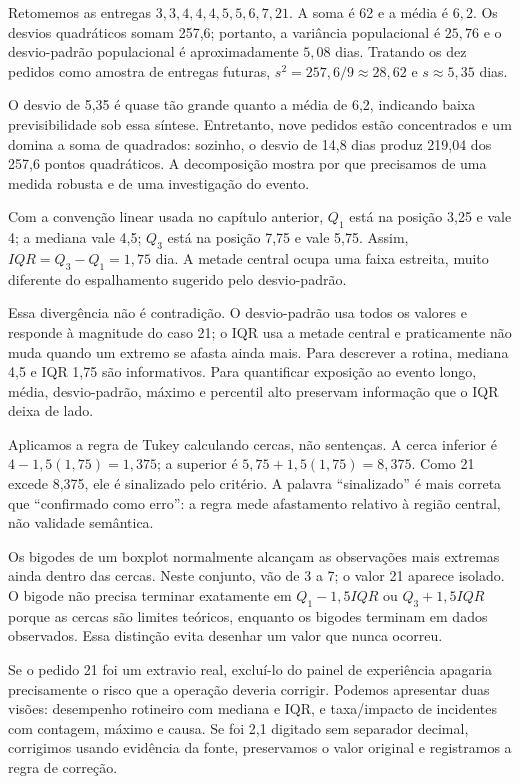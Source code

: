 Retomemos as entregas $3,3,4,4,4,5,5,6,7,21$. A soma é 62 e a média é $6{,}2$. Os desvios quadráticos somam 257,6; portanto, a variância populacional é $25{,}76$ e o desvio-padrão populacional é aproximadamente $5{,}08$ dias. Tratando os dez pedidos como amostra de entregas futuras, $s^2=257{,}6/9\approx28{,}62$ e $s\approx5{,}35$ dias.

O desvio de 5,35 é quase tão grande quanto a média de 6,2, indicando baixa previsibilidade sob essa síntese. Entretanto, nove pedidos estão concentrados e um domina a soma de quadrados: sozinho, o desvio de 14,8 dias produz 219,04 dos 257,6 pontos quadráticos. A decomposição mostra por que precisamos de uma medida robusta e de uma investigação do evento.

Com a convenção linear usada no capítulo anterior, $Q_1$ está na posição 3,25 e vale 4; a mediana vale 4,5; $Q_3$ está na posição 7,75 e vale 5,75. Assim, $IQR=Q_3-Q_1=1{,}75$ dia. A metade central ocupa uma faixa estreita, muito diferente do espalhamento sugerido pelo desvio-padrão.

Essa divergência não é contradição. O desvio-padrão usa todos os valores e responde à magnitude do caso 21; o IQR usa a metade central e praticamente não muda quando um extremo se afasta ainda mais. Para descrever a rotina, mediana 4,5 e IQR 1,75 são informativos. Para quantificar exposição ao evento longo, média, desvio-padrão, máximo e percentil alto preservam informação que o IQR deixa de lado.

Aplicamos a regra de Tukey calculando cercas, não sentenças. A cerca inferior é $4-1{,}5(1{,}75)=1{,}375$; a superior é $5{,}75+1{,}5(1{,}75)=8{,}375$. Como 21 excede 8,375, ele é sinalizado pelo critério. A palavra ``sinalizado'' é mais correta que ``confirmado como erro'': a regra mede afastamento relativo à região central, não validade semântica.

Os bigodes de um boxplot normalmente alcançam as observações mais extremas ainda dentro das cercas. Neste conjunto, vão de 3 a 7; o valor 21 aparece isolado. O bigode não precisa terminar exatamente em $Q_1-1{,}5IQR$ ou $Q_3+1{,}5IQR$ porque as cercas são limites teóricos, enquanto os bigodes terminam em dados observados. Essa distinção evita desenhar um valor que nunca ocorreu.

Se o pedido 21 foi um extravio real, excluí-lo do painel de experiência apagaria precisamente o risco que a operação deveria corrigir. Podemos apresentar duas visões: desempenho rotineiro com mediana e IQR, e taxa/impacto de incidentes com contagem, máximo e causa. Se foi 2,1 digitado sem separador decimal, corrigimos usando evidência da fonte, preservamos o valor original e registramos a regra de correção.

